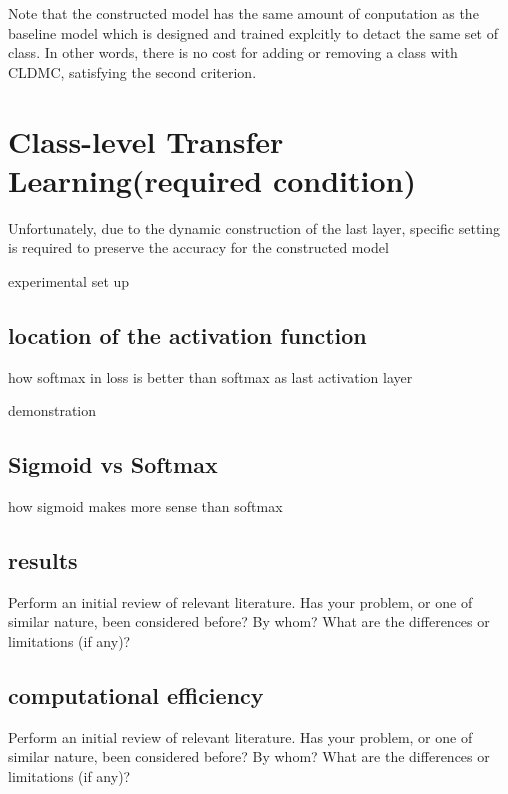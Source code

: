 \documentclass{article}
\begin{document}
Note that the constructed model has the same amount of conputation as the baseline model which is designed and trained explcitly to detact the same set of class. In other words, there is no cost for adding or removing a class with CLDMC, satisfying the second criterion.

\section{Class-level Transfer Learning(required condition)}

Unfortunately, due to the dynamic construction of the last layer, specific setting is required to preserve the accuracy for the constructed model

experimental set up

\subsection{location of the activation function}

how softmax in loss is better than softmax as last activation layer

demonstration

\subsection{Sigmoid vs Softmax}

how sigmoid makes more sense than softmax





















\subsection{results}
Perform an initial review of relevant literature. Has your problem, or one of similar nature, been considered before? By whom? What are the differences or limitations (if any)?

\subsection{computational efficiency}
Perform an initial review of relevant literature. Has your problem, or one of similar nature, been considered before? By whom? What are the differences or limitations (if any)?
\end{document}
